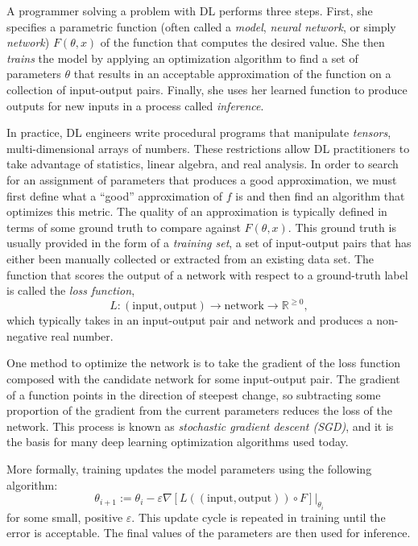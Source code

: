 A programmer solving a problem with DL performs three steps. First, she specifies a parametric
function (often called a \textit{model}, \textit{neural network}, or simply \textit{network})
$F(\theta, x)$ of the function that computes the desired value. She then \textit{trains} the model
by applying an optimization algorithm to find a set of parameters $\theta$ that results in an
acceptable approximation of the function on a collection of input-output pairs. Finally, she uses
her learned function to produce outputs for new inputs in a process called \textit{inference}.

In practice, DL engineers write procedural programs that manipulate \textit{tensors},
  multi-dimensional arrays of numbers.
These restrictions allow DL practitioners to take advantage of
  statistics, linear algebra, and real analysis.
In order to search for an assignment of parameters that produces a good approximation, we must first
  define what a ``good'' approximation of $f$ is and then find an algorithm that optimizes this metric.
The quality of an approximation is typically defined in terms of some ground truth to
  compare against $F(\theta, x)$.
This ground truth is usually provided in the form of a
\textit{training set}, a set of input-output pairs that has either been manually collected or
  extracted from an existing data set.
The function that scores the output of a network with respect
  to a ground-truth label is called the \textit{loss function},
\[
  L \colon (\text{input}, \text{output}) \to \text{network} \to \mathbb{R}^{\ge 0},
\]
which typically takes in an input-output pair and network and produces a non-negative real
number.

One method to optimize the network is to take the gradient of the loss function composed with the
candidate network for some input-output pair. The gradient of a function points in the direction of
steepest change, so subtracting some proportion of the gradient from the current parameters reduces
the loss of the network. This process is known as \textit{stochastic gradient descent (SGD)}, and it
is the basis for many deep learning optimization algorithms used today.

More formally, training updates the model parameters using the following algorithm:
\[
  \theta_{i+1} := \theta_i - \varepsilon\nabla[L((\text{input}, \text{output})) \circ F]\Big|_{\theta_i}
\]
for some small, positive $\varepsilon$. This update cycle is repeated in training until
the error is acceptable. The final values of the parameters are then used for inference.

